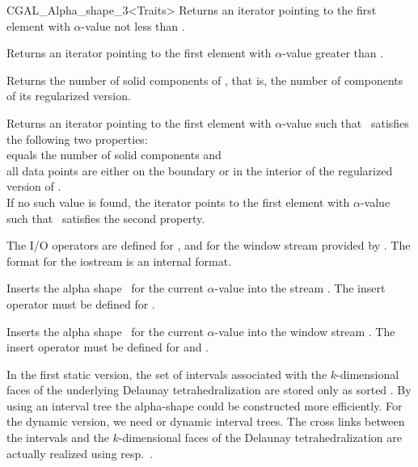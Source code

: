 \begin{ccClassTemplate} {CGAL_Alpha_shape_3<Traits>}
{Returns an iterator pointing to the first element with
$\alpha$-value not less than .}

{Returns an iterator pointing to the first element with $\alpha$-value
greater than .}


{Returns the number of solid components of \ccVar, that is, the number of components of its regularized version.}

{Returns an iterator pointing to the first element with $\alpha$-value
such that \ccVar\ satisfies the following two properties:\\
 equals the number of solid components and \\
all data points are either on the boundary or in the interior of the regularized version of \ccVar.\\
If no such value is found, the iterator points to the first element with 
$\alpha$-value such that \ccVar\ satisfies the second property.}

The I/O operators are defined for , and for
the window stream provided by \cgal. The format for the iostream
is an internal format. 


{Inserts the alpha shape \ccVar\ for the current $\alpha$-value into the stream .
\ccPrecond The insert operator must be defined for .}


{Inserts the alpha shape \ccVar\ for the current $\alpha$-value into the window stream .
\ccPrecond The insert operator must be defined for   and .}
\end{ccClassTemplate}

\ccImplementation
In the first static version, the set of intervals associated with the
$k$-dimensional faces of the underlying Delaunay tetrahedralization are
stored only as sorted . By using an interval tree the
alpha-shape could be constructed more efficiently. For the dynamic
version, we need  or dynamic interval trees. The
cross links between the intervals and the $k$-dimensional faces of the
Delaunay tetrahedralization are actually realized using
 resp.\ .

